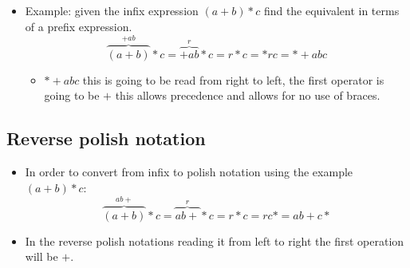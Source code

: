 \begin{itemize}
    \item Example: given the infix expression $(a+b)*c$ find the equivalent in terms of a prefix expression.
        \[
          \overbrace{(a+b)}^{+ab}*c = \overbrace{+ab}^{r}*c = r * c = *rc = *+abc
        \]
        \begin{itemize}
            \item $*+abc$ this is going to be read from right to left, the first operator is going to be $+$ this allows precedence and allows for no use of braces. 
        \end{itemize}
\end{itemize}

\subsection{Reverse polish notation}
\begin{itemize}
    \item In order to convert from infix to polish notation using the example $(a+b)*c$: 
        \[
            \overbrace{(a+b)}^{ab+}*c = \overbrace{ab+}^{r}*c = r*c = rc* = ab+c*
        \]
    
    \item In the reverse polish notations reading it from left to right the first operation will be $+$. 
\end{itemize}


